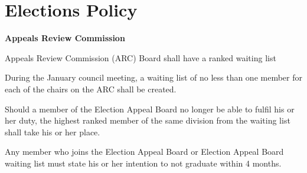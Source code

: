 \section{Elections Policy}
\begin{longenum}[label*=\arabic*., align=left]
 \item \textbf{Appeals Review Commission}
 \begin{longenum}[label*=\arabic*., align=left]
  \item Appeals Review Commission (ARC) Board shall have a ranked waiting list
  \item  During the January council meeting, a waiting list of no less than one member for each of the chairs on the ARC shall be created.
  \item Should a member of the Election Appeal Board no longer be able to fulfil his or her duty, the highest ranked member of the same division from the waiting list shall take his or her place.
  \item Any member who joins the Election Appeal Board or Election Appeal Board waiting list must state his or her intention to not graduate within 4 months.
  

\end{longenum}
\end{longenum}
